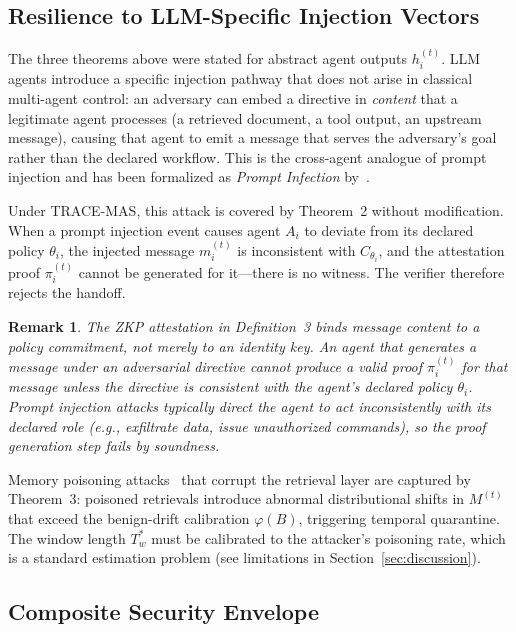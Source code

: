 \documentclass[conference]{IEEEtran}
\newtheorem{remark}{Remark}
\begin{document}
\subsection{Resilience to LLM-Specific Injection Vectors}
\label{subsec:injection}

The three theorems above were stated for abstract agent outputs
$h_i^{(t)}$. LLM agents introduce a specific injection pathway that
does not arise in classical multi-agent control: an adversary can
embed a directive in \emph{content} that a legitimate agent processes
(a retrieved document, a tool output, an upstream message), causing
that agent to emit a message that serves the adversary's goal rather
than the declared workflow. This is the cross-agent analogue of prompt
injection and has been formalized as \emph{Prompt Infection}
by~\cite{ref:promptinfection2024}.

Under \textsc{TRACE-MAS}, this attack is covered by Theorem~2 without
modification. When a prompt injection event causes agent $A_i$ to
deviate from its declared policy $\theta_i$, the injected message
$m_i^{(t)}$ is inconsistent with $C_{\theta_i}$, and the attestation
proof $\pi_i^{(t)}$ cannot be generated for it---there is no witness.
The verifier therefore rejects the handoff.

\begin{remark}
The ZKP attestation in Definition~3 binds message content to a
policy commitment, not merely to an identity key. An agent that
generates a message under an adversarial directive cannot produce a
valid proof $\pi_i^{(t)}$ for that message unless the directive is
consistent with the agent's declared policy $\theta_i$. Prompt
injection attacks typically direct the agent to act inconsistently
with its declared role (e.g., exfiltrate data, issue unauthorized
commands), so the proof generation step fails by soundness.
\end{remark}

Memory poisoning attacks~\cite{ref:agentpoison2024} that corrupt
the retrieval layer are captured by Theorem~3: poisoned retrievals
introduce abnormal distributional shifts in $M^{(t)}$ that exceed
the benign-drift calibration $\varphi(B)$, triggering temporal
quarantine. The window length $T_w^{*}$ must be calibrated to the
attacker's poisoning rate, which is a standard estimation problem
(see limitations in Section~\ref{sec:discussion}).

\subsection{Composite Security Envelope}
\label{subsec:composite}
\end{document}
